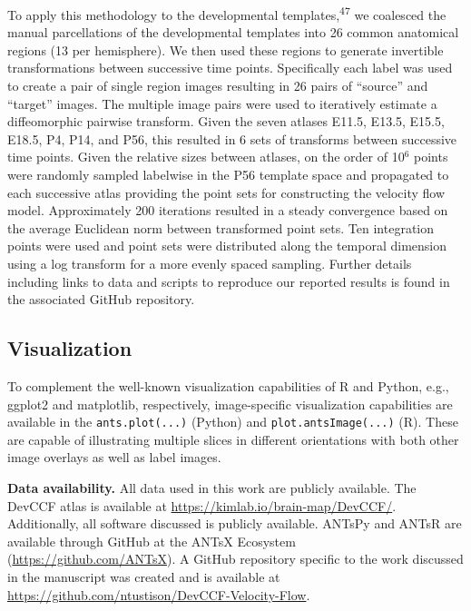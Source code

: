 \documentclass[
  12pt,
]{article}
\begin{document}
To apply this methodology to the developmental
templates,\textsuperscript{47} we coalesced the manual parcellations of
the developmental templates into 26 common anatomical regions (13 per
hemisphere). We then used these regions to generate invertible
transformations between successive time points. Specifically each label
was used to create a pair of single region images resulting in 26 pairs
of ``source'' and ``target'' images. The multiple image pairs were used
to iteratively estimate a diffeomorphic pairwise transform. Given the
seven atlases E11.5, E13.5, E15.5, E18.5, P4, P14, and P56, this
resulted in 6 sets of transforms between successive time points. Given
the relative sizes between atlases, on the order of 10\(^6\) points were
randomly sampled labelwise in the P56 template space and propagated to
each successive atlas providing the point sets for constructing the
velocity flow model. Approximately 200 iterations resulted in a steady
convergence based on the average Euclidean norm between transformed
point sets. Ten integration points were used and point sets were
distributed along the temporal dimension using a log transform for a
more evenly spaced sampling. Further details including links to data and
scripts to reproduce our reported results is found in the associated
GitHub repository.

\hypertarget{visualization}{%
\subsection*{Visualization}\label{visualization}}

To complement the well-known visualization capabilities of R and Python,
e.g., ggplot2 and matplotlib, respectively, image-specific visualization
capabilities are available in the \texttt{ants.plot(...)} (Python) and
\texttt{plot.antsImage(...)} (R). These are capable of illustrating
multiple slices in different orientations with both other image overlays
as well as label images.

\clearpage
\newpage

\textbf{Data availability.} All data used in this work are publicly
available. The DevCCF atlas is available at
\url{https://kimlab.io/brain-map/DevCCF/}. Additionally, all software
discussed is publicly available. ANTsPy and ANTsR are available through
GitHub at the ANTsX Ecosystem (\url{https://github.com/ANTsX}). A GitHub
repository specific to the work discussed in the manuscript was created
and is available at
\url{https://github.com/ntustison/DevCCF-Velocity-Flow}.
\end{document}
